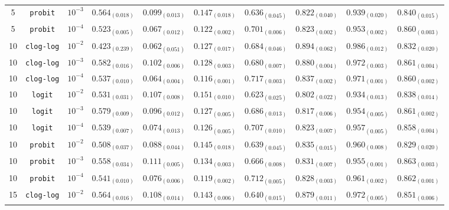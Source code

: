 \documentclass[journal]{IEEEtran}
\begin{document}
\begin{table}[!t]
\begin{tabular}{c@{\hskip 0.15cm}c@{\hskip 0.15cm}c@{\hskip 0.15cm}c@{\hskip 0.30cm}c@{\hskip 0.20cm}c@{\hskip 0.20cm}c@{\hskip 0.20cm}c@{\hskip 0.20cm}c@{\hskip 0.20cm}c}
			5 & \texttt{probit} & $10^{-3}$ & $0.564_{(0.018)}$ & $0.099_{(0.013)}$ & $0.147_{(0.018)}$ & $0.636_{(0.045)}$ & $0.822_{(0.040)}$ & $0.939_{(0.020)}$ & $0.840_{(0.015)}$\\
			5 & \texttt{probit} & $10^{-4}$ & $0.523_{(0.005)}$ & $0.067_{(0.012)}$ & $0.122_{(0.002)}$ & $0.701_{(0.006)}$ & $0.823_{(0.002)}$ & $0.953_{(0.002)}$ & $0.860_{(0.003)}$\\
			10 & \texttt{clog-log} & $10^{-2}$ & $0.423_{(0.239)}$ & $0.062_{(0.051)}$ & $0.127_{(0.017)}$ & $0.684_{(0.046)}$ & $\mathbf{0.894_{(0.062)}}$ & $\mathbf{0.986_{(0.012)}}$ & $0.832_{(0.020)}$\\
			10 & \texttt{clog-log} & $10^{-3}$ & $\mathbf{0.582_{(0.016)}}$ & $0.102_{(0.006)}$ & $0.128_{(0.003)}$ & $0.680_{(0.007)}$ & $\mathit{0.880_{(0.004)}}$ & $0.972_{(0.003)}$ & $0.861_{(0.004)}$\\
			10 & \texttt{clog-log} & $10^{-4}$ & $0.537_{(0.010)}$ & $0.064_{(0.004)}$ & $\mathit{0.116_{(0.001)}}$ & $0.717_{(0.003)}$ & $0.837_{(0.002)}$ & $0.971_{(0.001)}$ & $0.860_{(0.002)}$\\
			10 & \texttt{logit} & $10^{-2}$ & $0.531_{(0.031)}$ & $0.107_{(0.008)}$ & $0.151_{(0.010)}$ & $0.623_{(0.025)}$ & $0.802_{(0.022)}$ & $0.934_{(0.013)}$ & $0.838_{(0.014)}$\\
			10 & \texttt{logit} & $10^{-3}$ & $0.579_{(0.009)}$ & $0.096_{(0.012)}$ & $0.127_{(0.005)}$ & $0.686_{(0.013)}$ & $0.817_{(0.006)}$ & $0.954_{(0.005)}$ & $0.861_{(0.002)}$\\
			10 & \texttt{logit} & $10^{-4}$ & $0.539_{(0.007)}$ & $0.074_{(0.013)}$ & $0.126_{(0.005)}$ & $0.707_{(0.010)}$ & $0.823_{(0.007)}$ & $0.957_{(0.005)}$ & $0.858_{(0.004)}$\\
			10 & \texttt{probit} & $10^{-2}$ & $0.508_{(0.037)}$ & $0.088_{(0.044)}$ & $0.145_{(0.018)}$ & $0.639_{(0.045)}$ & $0.835_{(0.015)}$ & $0.960_{(0.008)}$ & $0.829_{(0.020)}$\\
			10 & \texttt{probit} & $10^{-3}$ & $0.558_{(0.034)}$ & $\mathbf{0.111_{(0.005)}}$ & $0.134_{(0.003)}$ & $0.666_{(0.008)}$ & $0.831_{(0.007)}$ & $0.955_{(0.001)}$ & $0.863_{(0.003)}$\\
			10 & \texttt{probit} & $10^{-4}$ & $0.541_{(0.010)}$ & $0.076_{(0.006)}$ & $0.119_{(0.002)}$ & $0.712_{(0.005)}$ & $0.828_{(0.003)}$ & $0.961_{(0.002)}$ & $0.862_{(0.001)}$\\
			15 & \texttt{clog-log} & $10^{-2}$ & $0.564_{(0.016)}$ & $0.108_{(0.014)}$ & $0.143_{(0.006)}$ & $0.640_{(0.015)}$ & $0.879_{(0.011)}$ & $0.972_{(0.005)}$ & $0.851_{(0.006)}$\\

\end{tabular}
\end{table}
\end{document}
